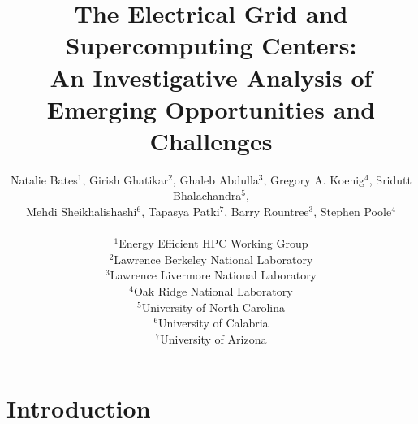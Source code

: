 \documentclass{../style/sig-alternate}
\begin{document}
%

\title{
The Electrical Grid and Supercomputing Centers:\\
An Investigative Analysis of Emerging Opportunities and Challenges
}

\author{Natalie Bates$^1$, Girish Ghatikar$^2$,
  Ghaleb Abdulla$^3$, Gregory A. Koenig$^4$, Sridutt Bhalachandra$^5$, \\
	Mehdi Sheikhalishashi$^6$, Tapasya Patki$^7$, Barry Rountree$^3$, Stephen Poole$^4$
	\\ \\
	$^1$Energy Efficient HPC Working Group\\
       $^2$Lawrence Berkeley National Laboratory\\
       $^3$Lawrence Livermore National Laboratory\\
			 $^4$Oak Ridge National Laboratory\\
			 $^5$University of North Carolina\\
			$^6$University of Calabria\\
			$^7$University of Arizona
	}


\maketitle              %





%
\section{Introduction}
\label{sec:intro}

\end{document}
